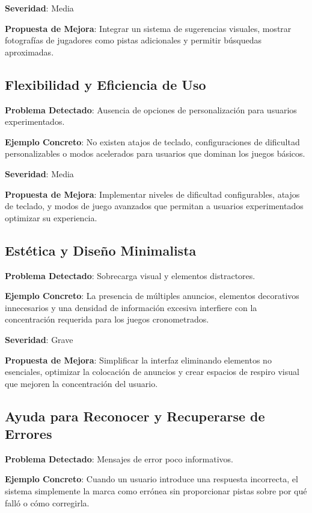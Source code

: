 \documentclass{article}
\begin{document}
	\noindent
	\textbf{Severidad}: Media
	
	\noindent
	\textbf{Propuesta de Mejora}: Integrar un sistema de sugerencias visuales, mostrar fotografías de jugadores como pistas adicionales y permitir búsquedas aproximadas.

	\subsection{Flexibilidad y Eficiencia de Uso}
	\noindent
	\textbf{Problema Detectado}: Ausencia de opciones de personalización para usuarios experimentados.
	
	\noindent
	\textbf{Ejemplo Concreto}: No existen atajos de teclado, configuraciones de dificultad personalizables o modos acelerados para usuarios que dominan los juegos básicos.
	
	\noindent
	\textbf{Severidad}: Media
	
	\noindent
	\textbf{Propuesta de Mejora}: Implementar niveles de dificultad configurables, atajos de teclado, y modos de juego avanzados que permitan a usuarios experimentados optimizar su experiencia.

	\subsection{Estética y Diseño Minimalista}
	\noindent
	\textbf{Problema Detectado}: Sobrecarga visual y elementos distractores.
	
	\noindent
	\textbf{Ejemplo Concreto}: La presencia de múltiples anuncios, elementos decorativos innecesarios y una densidad de información excesiva interfiere con la concentración requerida para los juegos cronometrados.
	
	\noindent
	\textbf{Severidad}: Grave
	
	\noindent
	\textbf{Propuesta de Mejora}: Simplificar la interfaz eliminando elementos no esenciales, optimizar la colocación de anuncios y crear espacios de respiro visual que mejoren la concentración del usuario.

	\subsection{Ayuda para Reconocer y Recuperarse de Errores}
	\noindent
	\textbf{Problema Detectado}: Mensajes de error poco informativos.
	
	\noindent
	\textbf{Ejemplo Concreto}: Cuando un usuario introduce una respuesta incorrecta, el sistema simplemente la marca como errónea sin proporcionar pistas sobre por qué falló o cómo corregirla.
	
\end{document}

